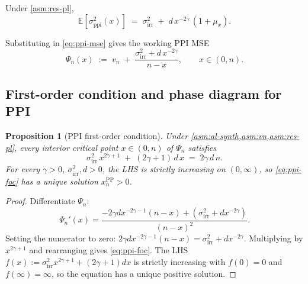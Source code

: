\documentclass[11pt]{article}
\theoremstyle{plain}
\newtheorem{proposition}[theorem]{Proposition}
\theoremstyle{definition}
\theoremstyle{remark}
\newcommand{\E}{\mathbb{E}}
\begin{document}
Under \cref{asm:res-pl},
\begin{equation}\label{eq:bar-sigma-ppi}
\E[\sigma_{\mathrm{ppi}}^2(x)]\;=\;\sigma_{\mathrm{irr}}^2\;+\;d\,x^{-2\gamma}\,(1+\mu_x).
\end{equation}

Substituting in \cref{eq:ppi-mse} gives the working PPI MSE
\begin{equation}\label{eq:Psi-def}
\Psi_n(x)\;:=\;v_n\;+\;\frac{\sigma_{\mathrm{irr}}^2+d\,x^{-2\gamma}}{n-x},\qquad x\in(0,n).
\end{equation}

\subsection{First-order condition and phase diagram for PPI}
\label{ssec:ppi-phase}

\begin{proposition}[PPI first-order condition]\label{prop:ppi-foc}
Under \cref{asm:al-synth,asm:vn,asm:res-pl}, every interior critical point $x\in(0,n)$ of $\Psi_n$ satisfies
\begin{equation}\label{eq:ppi-foc}
\boxed{\sigma_{\mathrm{irr}}^2\,x^{2\gamma+1}\;+\;(2\gamma+1)\,d\,x\;=\;2\gamma\,d\,n.}
\end{equation}
For every $\gamma>0$, $\sigma_{\mathrm{irr}}^2,d>0$, the LHS is strictly increasing on $(0,\infty)$, so \cref{eq:ppi-foc} has a unique solution $x_n^{\mathrm{PP}}>0$.
\end{proposition}

\begin{proof}
Differentiate $\Psi_n$:
\begin{equation*}
\Psi_n'(x)=\frac{-2\gamma d x^{-2\gamma-1}(n-x)+(\sigma_{\mathrm{irr}}^2+dx^{-2\gamma})}{(n-x)^2}.
\end{equation*}
Setting the numerator to zero: $2\gamma d x^{-2\gamma-1}(n-x)=\sigma_{\mathrm{irr}}^2+dx^{-2\gamma}$. Multiplying by $x^{2\gamma+1}$ and rearranging gives \cref{eq:ppi-foc}. The LHS $f(x):=\sigma_{\mathrm{irr}}^2 x^{2\gamma+1}+(2\gamma+1)dx$ is strictly increasing with $f(0)=0$ and $f(\infty)=\infty$, so the equation has a unique positive solution.
\end{proof}
\end{document}

